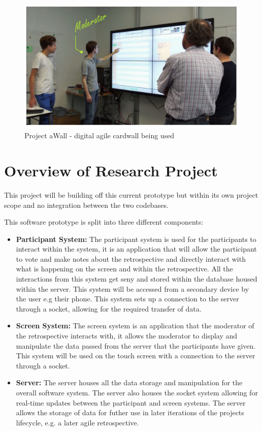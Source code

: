 \documentclass[11pt
              , a4paper
              , twoside
              , openright
              ]{report}
\begin{document}
\begin{figure}[ht]
	\centering
	\includegraphics{aWall_introduction}
	\caption{Project aWall - digital agile cardwall being used \cite{xp2017_aWall}}
\end{figure}

\section{Overview of Research Project}
This project will be building off this current prototype but within its own project scope and no integration between the two codebases.

This software prototype is split into three different components:
\begin{itemize}
	\item \textbf{Participant System:} The participant system is used for the participants to interact within the system, it is an application that will allow the participant to vote and make notes about the retrospective and directly interact with what is happening on the screen and within the retrospective. All the interactions from this system get seny and stored within the database housed within the server. This system will be accessed from a secondary device by the user e.g their phone. This system sets up a connection to the server through a socket, allowing for the required transfer of data.
	\item \textbf{Screen System:} The screen system is an application that the moderator of the retrospective interacts with, it allows the moderator to display and manipulate the data passed from the server that the participants have given. This system will be used on the touch screen with a connection to the server through a socket.  
	\item \textbf{Server:} The server houses all the data storage and manipulation for the overall software system. The server also houses the socket system allowing for real-time updates between the participant and screen systems. The server allows the storage of data for futher use in later iterations of the projects lifecycle, e.g. a later agile retrospective. 
\end{itemize}
\end{document}

